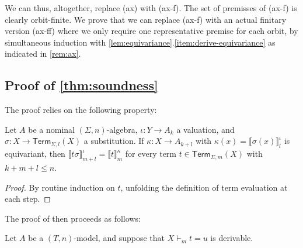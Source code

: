 \documentclass[a4paper,UKenglish,cleveref,thm-restate,numberwithinsect,final]{lipics-v2021}
\newcommand{\Term}{\mathsf{Term}}
\theoremstyle{plain}
\numberwithin{equation}{section}
\newcommand{\+}[1]{\mathcal{#1}\xspace}
\theoremstyle{definition}
\begin{document}
We can thus, altogether, replace (ax) with (ax-f). The set of
premisses of (ax-f) is clearly orbit-finite. We prove that we can
replace (ax-f) with an actual finitary version (ax-ff) where we only
require one representative premise for each orbit, by simultaneous
induction with
\cref{lem:equivariance}.\eqref{item:derive-equivariance} as
indicated in \cref{rem:ax}.

\subsection*{Proof of \cref{thm:soundness}}
The proof relies on the following property:
\begin{lemma}\label{thm:substitutionlemma}
    Let \(A\) be a nominal \((\Sigma, n)\)-algebra, \(\iota: Y \to A_k\) a valuation, and \(\sigma: X \to \Term_{\Sigma, l}(X)\) a substitution.
    If \(\kappa: X \to A_{k + l}\) with \(\kappa(x) = \llbracket \sigma(x) \rrbracket^\iota_l\) is equivariant, then \(\llbracket t\sigma \rrbracket^\iota_{m + l} = \llbracket t \rrbracket^\kappa_m\) for every term \(t \in \Term_{\Sigma, m}(X)\) with \(k + m + l \le n\).
\end{lemma}
\begin{proof}
  By routine induction on $t$, unfolding the definition of term
  evaluation at each step.
\end{proof}

The proof of  then proceeds as follows:

Let \(A\) be a \((T, n)\)-model, and suppose that \(X \vdash_m t = u\) is derivable.
\end{document}
